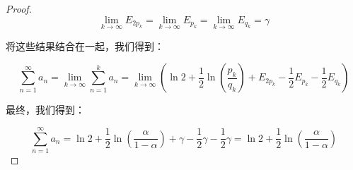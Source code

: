 \documentclass{ctexart}
\begin{document}
\begin{proof}
\[
\lim_{k \to \infty} E_{2p_k} = \lim_{k \to \infty} E_{p_k} = \lim_{k \to \infty} E_{q_k} = \gamma
\]

将这些结果结合在一起，我们得到：

\[
\sum_{n=1}^{\infty} a_n = \lim_{k \to \infty} \sum_{n=1}^{k} a_n = \lim_{k \to \infty} \left(\ln 2 + \frac{1}{2} \ln \left(\frac{p_k}{q_k}\right) + E_{2p_k} - \frac{1}{2} E_{p_k} - \frac{1}{2} E_{q_k}\right)
\]

最终，我们得到：

\[
\sum_{n=1}^{\infty} a_n = \ln 2 + \frac{1}{2} \ln \left(\frac{\alpha}{1 - \alpha}\right) + \gamma - \frac{1}{2}\gamma - \frac{1}{2}\gamma = \ln 2 + \frac{1}{2} \ln \left(\frac{\alpha}{1 - \alpha}\right)
\]

\end{proof}
\end{document}
